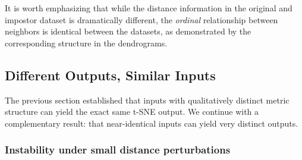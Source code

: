 It is worth emphasizing that while the distance information in the original and impostor dataset is dramatically different, the \textit{ordinal} relationship between neighbors is identical between the datasets, as demonstrated by the corresponding structure in the dendrograms. %










\subsection{Different Outputs, Similar Inputs}

The previous section established that inputs with qualitatively distinct metric structure can yield the exact same t-SNE output. We continue with a complementary result: that near-identical inputs can yield very distinct outputs. %

\subsubsection{Instability under small distance perturbations}


